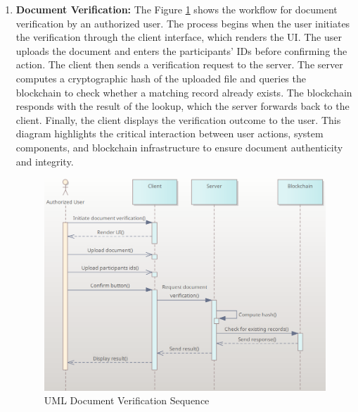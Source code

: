 \begin{enumerate}
    \item \textbf{Document Verification:} The Figure \ref{uml-sequence-verify} shows the workflow for document verification by an authorized user. The process begins when the user initiates the verification through the client interface, which renders the UI. The user uploads the document and enters the participants’ IDs before confirming the action. The client then sends a verification request to the server. The server computes a cryptographic hash of the uploaded file and queries the blockchain to check whether a matching record already exists. The blockchain responds with the result of the lookup, which the server forwards back to the client. Finally, the client displays the verification outcome to the user. This diagram highlights the critical interaction between user actions, system components, and blockchain infrastructure to ensure document authenticity and integrity.
    \begin{figure}[H]
        \centering
        \includegraphics[width=18cm]{"images/umlDiagrams/uml-sequence-verify.png"}
        \caption{UML Document Verification Sequence}
        \label{uml-sequence-verify}
    \end{figure}


\end{enumerate}
